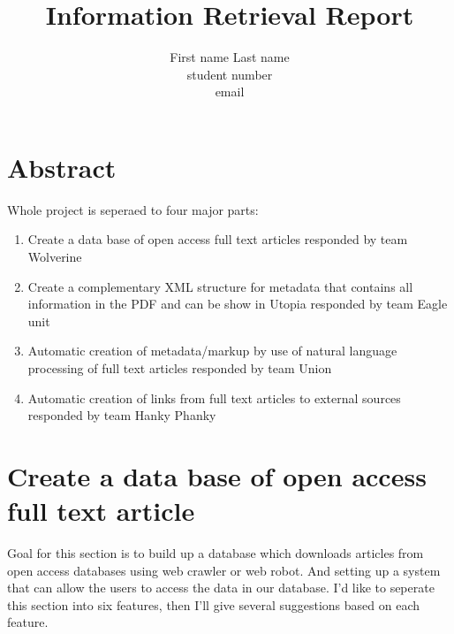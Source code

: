 \documentclass[a4paper]{article} %
\begin{document}

\title{Information Retrieval Report}
\author{First name Last name \\ student number \\ email} 

\maketitle                     %





\section*{Abstract}
\label{abstract}

Whole project is seperaed to four major parts:
\begin{enumerate}
  \item Create a data base of open access full text articles responded by team Wolverine
  \item Create a complementary XML structure for metadata that contains all information in the PDF and can be show in Utopia responded by team Eagle unit
  \item Automatic creation of metadata/markup by use of natural language processing of full text articles responded by team Union
  \item Automatic creation of links from full text articles to external sources responded by team Hanky Phanky
\end{enumerate}


\section*{Create a data base of open access full text article}
\label{task1}

Goal for this section is to build up a database which downloads articles from open access databases using web crawler or web robot. And setting up a system that can allow the users to access the data in our database. I'd like to seperate this section into six features, then I'll give several suggestions based on each feature. 
\end{document}
